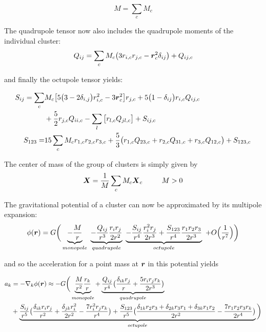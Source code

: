 \begin{equation}
\label{ch02_grav02_eq006}
M = \sum_{c} M_{c}
\end{equation}

The quadrupole tensor now also includes the quadrupole moments of the individual cluster:
\begin{equation}
\label{ch02_grav02_eq007}
Q_{ij} = \sum_{c} M_{c} \big( 3 r_{i, c} r_{j, c} - \boldsymbol{r}_{c}^{2} \delta_{i j} \big) + Q_{i j, c} 
\end{equation}

and finally the octupole tensor yields:

\begin{align}
\label{ch02_grav02_eq008}
S_{ij} = \sum_{c}&  M_{c} \big[ 5 \big( 3 - 2 \delta_{i,j} \big) r_{i, c}^{2} - 3 \boldsymbol{r}_{c}^2 \big] r_{j, c} 
+ 5 \big( 1 - \delta_{i j} \big) r_{i, c} Q_{i j, c} \nonumber \\
&+ \frac{5}{2} r_{j, c} Q_{i i, c} - \sum_{l} \big[ r_{l, c} Q_{j l, c} \big] + S_{i j, c} \\
S_{1 2 3} =& 15 \sum_{c} M_{c} r_{1, c} r_{2, c} r_{3, c} + \frac{5}{3} \big( r_{1, c} Q_{2 3, c} + r_{2, c} Q_{3 1, c} + r_{3, c} Q_{1 2, c} \big) + S_{1 2 3, c }
\end{align}

The center of mass of the group of clusters is simply given by 
\begin{equation}
\label{ch02_grav02_eq009}
\boldsymbol{X} = \frac{1}{M} \sum_{c} M_{c} \boldsymbol{X}_{c} ~~~~~~~~  M > 0
\end{equation}

The gravitational potential of a cluster can now be approximated by its multipole expansion:
\begin{equation}
\label{ch02_grav02_eq010}
\phi(\boldsymbol{r}) = G \bigg(
\underbrace{ - \frac{M}{r} }_{monopole} ~ 
\underbrace{ - \frac{Q_{i j}}{r^{3}} \frac{r_{i} r_{j} }{2 r^{2} } }_{quadrupole}~ 
\underbrace{ - \frac{S_{i j}}{r^{4}} \frac{r_{i}^2 r_{j}}{2 r^{3} } + \frac{ S_{1 2 3} }{r^{4}}\frac{ r_{1} r_{2} r_{3} }{2 r^{3}} }_{octupole}~ 
+ O\Big(\frac{1}{r^{7}}\Big) \bigg)
\end{equation}

and so the acceleration for a point mass at $\boldsymbol{r}$ in this potential yields

\begin{align}
\label{ch02_grav02_eq011}
a_{k} &= - \nabla_{k} \phi(\boldsymbol{r}) \approx - G \bigg(
\underbrace{ \frac{M}{r^{2}} \frac{r_{k}}{r} }_{monopole}+ 
\underbrace{ \frac{Q_{i j}}{r^{4}}
\big( \frac{\delta_{i k} r_{j} }{r} + \frac{5 r_{i} r_{j} r_{k} }{2r^{3}} \big)
}_{quadrupole} \nonumber \\
&+ \underbrace{ \frac{S_{i j}}{r^{5}}
\big( \frac{ \delta_{i k} r_{i} r_{j} }{r^{2}}
+ \frac{ \delta_{j k} r_{i}^{2} }{2 r^{2} }
- \frac{7 r_{i}^{2} r_{j} r_{k} }{r^{4} } \big) 
 + \frac{S_{1 2 3}}{r^{5} }
\big( \frac{\delta_{1 k} r_{2} r_{3} + \delta_{2 k} r_{3} r_{1} + \delta_{3 k} r_{1} r_{2}}{2 r^{2}} 
- \frac{7 r_{1} r_{2} r_{3} r_{k} }{2 r^{4}}\big) 
}_{octupole}
\bigg)
\end{align}

